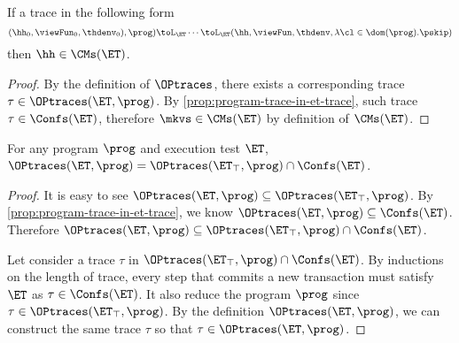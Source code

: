 \begin{corollary}
If a trace in the following form
\[
    (\hh_{0}, \viewFun_{0}, \thdenv_{0}), \prog) \toL_{\ET} \cdots \toL_{\ET} 
    (\hh, \viewFun, \thdenv, \lambda \cl \in \dom(\prog). \pskip)
\]
then $\hh \in \CMs(\ET)$.
\end{corollary}
\begin{proof}
    By the definition of \( \OPtraces \), 
    there exists a corresponding trace \( \tau \in \OPtraces(\ET, \prog) \).
    By \cref{prop:program-trace-in-et-trace}, such trace \( \tau \in \Confs(\ET) \),
    therefore \( \mkvs \in \CMs(\ET)\) by definition of \( \CMs(\ET) \).
\end{proof}

\begin{proposition}
For any program $\prog$ and execution test $\ET$, $\OPtraces(\ET, \prog) = \OPtraces(\ET_{\top}, \prog) 
\cap \Confs(\ET)$.
\end{proposition}
\begin{proof}
    It is easy to see \(\OPtraces(\ET, \prog) \subseteq \OPtraces(\ET_\top, \prog) \).
    By \cref{prop:program-trace-in-et-trace}, we know \( \OPtraces(\ET, \prog) \subseteq \Confs(\ET)\).
    Therefore \(  \OPtraces(\ET, \prog) \subseteq \OPtraces(\ET_\top, \prog) \cap \Confs(\ET) \).

    Let consider a trace \( \tau \) in \( \OPtraces(\ET_\top, \prog) \cap \Confs(\ET) \).
    By inductions on the length of trace, 
    every step that commits a new transaction  must satisfy \( \ET \) as \( \tau \in \Confs(\ET) \).
    It also reduce the program \( \prog \) since \( \tau \in \OPtraces(\ET_\top, \prog) \).
    By the definition \( \OPtraces(\ET, \prog) \), we can construct the same trace \( \tau \) so that \( \tau \in \OPtraces(\ET, \prog) \).
\end{proof}
